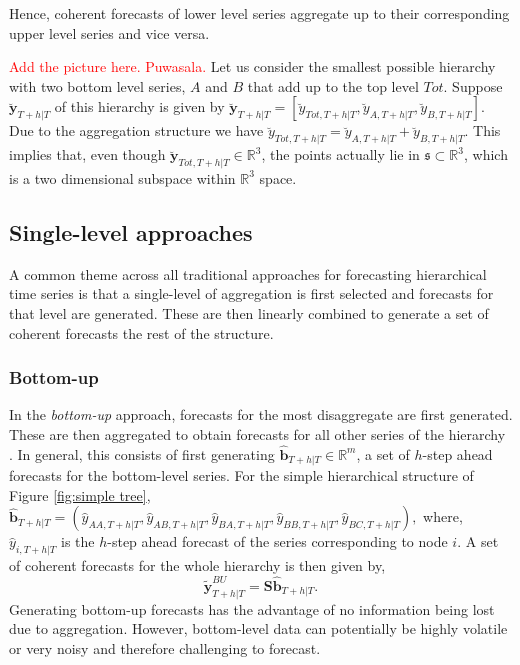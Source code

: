 \documentclass[graybox]{svmult}
\begin{document}
Hence, coherent forecasts of lower level series aggregate up to their corresponding upper level series and vice versa.

\textcolor{red}{Add the picture here. Puwasala.}
Let us consider the smallest possible hierarchy with two bottom level series, $A$ and $B$ that add up to the top level $Tot$. Suppose $\breve{\bm{y}}_{T+h|T}$ of this hierarchy is given by $\breve{\bm{y}}_{T+h|T} = [\breve{y}_{Tot,T+h|T},\breve{y}_{A,T+h|T}, \breve{y}_{B,T+h|T}]$. Due to the aggregation structure we have $\breve{y}_{Tot,T+h|T}=\breve{y}_{A,T+h|T}+\breve{y}_{B,T+h|T}$. This implies that, even though  $\breve{\bm{y}}_{Tot,T+h|T} \in \mathbb{R}^3$, the points actually lie in $\mathfrak{s}\subset \mathbb{R}^3$, which is a two dimensional subspace within $\mathbb{R}^3$ space.

\subsection{Single-level approaches}\label{sec:single level approaches}
A common theme across all traditional approaches for forecasting hierarchical time series is that a single-level of aggregation is first selected and forecasts for that level are generated. These are then linearly combined to generate a set of coherent forecasts the rest of the structure.

\subsubsection{Bottom-up}

In the \textit{bottom-up} approach, forecasts for the most disaggregate are first generated. These are then aggregated to obtain forecasts for all other series of the hierarchy \citep{dunn1976}. In general, this consists of first generating $\hat{\bm{b}}_{T+h|T} \in \mathbb{R}^m$, a set of $h$-step ahead forecasts for the bottom-level series. For the simple hierarchical structure of Figure \ref{fig:simple tree}, $\hat{\bm{b}}_{T+h|T} = (\hat{{y}}_{AA,T+h|T}, \hat{{y}}_{AB,T+h|T}, \hat{{y}}_{BA,T+h|T}, \hat{{y}}_{BB,T+h|T},\hat{{y}}_{BC,T+h|T}),$ where, $\hat{{y}}_{i,T+h|T}$ is the $h$-step ahead forecast of the series corresponding to node $i$. A set of coherent forecasts for the whole hierarchy is then given by,
\begin{equation*}\label{eq:BU}
\tilde{\bm{y}}^{BU}_{T+h|T}=\bm{S\hat{\bm{b}}}_{T+h|T}.
\end{equation*}
Generating bottom-up forecasts has the advantage of no information being lost due to aggregation. However, bottom-level data can potentially be highly volatile or very noisy and therefore challenging to forecast.
\end{document}
